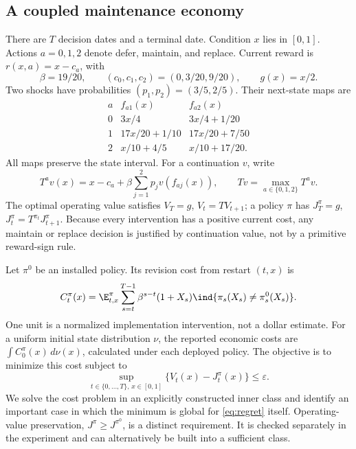 \subsection{A coupled maintenance economy}
There are $T$ decision dates and a terminal date. Condition $x$ lies in $[0,1]$. Actions $a=0,1,2$ denote defer, maintain, and replace. Current reward is $r(x,a)=x-c_a$, with
\begin{equation}\label{eq:primitives}
 \beta=19/20,\qquad (c_0,c_1,c_2)=(0,3/20,9/20),\qquad g(x)=x/2.
\end{equation}
Two shocks have probabilities $(p_1,p_2)=(3/5,2/5)$. Their next-state maps are
\begin{equation}\label{eq:maps}
\begin{array}{c|cc}
 a&f_{a1}(x)&f_{a2}(x)\\\hline
 0&3x/4&3x/4+1/20\\
 1&17x/20+1/10&17x/20+7/50\\
 2&x/10+4/5&x/10+17/20.
\end{array}
\end{equation}
All maps preserve the state interval. For a continuation $v$, write
\begin{equation}
 T^a v(x)=x-c_a+\beta\sum_{j=1}^2p_jv(f_{aj}(x)),\qquad
 Tv=\max_{a\in\{0,1,2\}}T^a v.
\end{equation}
The optimal operating value satisfies $V_T=g$, $V_t=TV_{t+1}$; a policy $\pi$ has $J_T^\pi=g$, $J_t^\pi=T^{\pi_t}J_{t+1}^\pi$. Because every intervention has a positive current cost, any maintain or replace decision is justified by continuation value, not by a primitive reward-sign rule.

Let $\pi^0$ be an installed policy. Its revision cost from restart $(t,x)$ is
\begin{equation}\label{eq:cost}
 C_t^\pi(x)=\E_{t,x}^{\pi}\sum_{s=t}^{T-1}\beta^{s-t}
 (1+X_s)\ind\{\pi_s(X_s)\ne\pi_s^0(X_s)\}.
\end{equation}
One unit is a normalized implementation intervention, not a dollar estimate. For a uniform initial state distribution $\nu$, the reported economic costs are $\int C_0^\pi(x)\,d\nu(x)$, calculated under each deployed policy. The objective is to minimize this cost subject to
\begin{equation}\label{eq:regret}
 \sup_{t\in\{0,\ldots,T\},\,x\in[0,1]}\{V_t(x)-J_t^\pi(x)\}\le\varepsilon.
\end{equation}
We solve the cost problem in an explicitly constructed inner class and identify an important case in which the minimum is global for \eqref{eq:regret} itself. Operating-value preservation, $J^\pi\ge J^{\pi^0}$, is a distinct requirement. It is checked separately in the experiment and can alternatively be built into a sufficient class.


